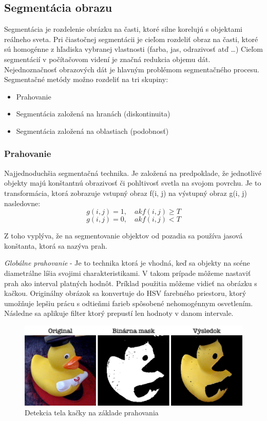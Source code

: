 \subsection{Segmentácia obrazu}
Segmentácia je rozdelenie obrázku na časti, ktoré silne korelujú s objektami reálneho sveta. Pri čiastočnej segmentácii je cieľom rozdeliť obraz na časti, ktoré sú homogénne z hľadiska vybranej vlastnosti (farba, jas, odrazivosť atď …) Cieľom segmentácií v počítačovom videní je značná redukcia objemu dát. Nejednoznačnosť obrazových dát je hlavným problémom segmentačného procesu. Segmentačné metódy možno rozdeliť na tri skupiny: 


\begin{itemize}
\item Prahovanie
\item Segmentácia založená na hranách (diskontinuita)
\item Segmentácia založená na oblastiach (podobnosť)
\end{itemize}

\subsubsection{Prahovanie}
Najjednoduchšia segmentačná technika. Je založená na predpoklade, že jednotlivé objekty majú konštantnú obrazivosť či pohltivosť svetla na svojom povrchu. Je to transformácia, ktorá zobrazuje vstupný obraz f(i, j) na výstupný obraz g(i, j) nasledovne: 
$$g (i{,}j)=1 {,}\quad {ak} f(i{,}j)\ge T$$
$$g (i{,}j)=0 {,}\quad {ak} f(i{,}j)  < T$$


Z toho vyplýva, že na segmentovanie objektov od pozadia sa používa jasová konštanta, ktorá sa nazýva prah. 


\textit{Globálne prahovanie} - Je to technika ktorá je vhodná, keď sa objekty na scéne diametrálne líšia svojimi charakteristikami. V takom prípade môžeme nastaviť prah ako interval platných hodnôt. Príklad použitia môžeme vidieť na obrázku s kačkou. Originálny obrázok sa konvertuje do HSV farebného priestoru, ktorý umožňuje lepšiu prácu s odtieňmi farieb spôsobené nehomogénnym osvetlením. Následne sa aplikuje filter ktorý prepustí len hodnoty v danom intervale.

\begin{figure}[H]
\begin{center}
	\includegraphics[scale=0.25]{obrazky/prahovanie}
	\caption{Detekcia tela kačky na základe prahovania}
	\end{center}
\end{figure}


